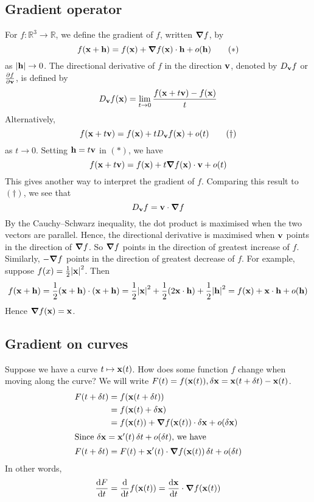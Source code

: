 \subsection{Gradient operator}
For \(f \colon \mathbb R^3 \to \mathbb R\), we define the gradient of \(f\), written \(\grad f\), by
\begin{equation}
	f(\vb x + \vb h) = f(\vb x) + \grad f(\vb x) \cdot \vb h + o(\vb h)
	\tag{\(\ast\)}
\end{equation}
as \(\abs{\vb h} \to 0\).
The directional derivative of \(f\) in the direction \(\vb v\), denoted by \(D_{\vb v} f\) or \(\frac{\partial f}{\partial \vb v}\), is defined by
\[
	D_{\vb v} f(\vb x) = \lim_{t \to 0} \frac{f(\vb x + t\vb v) - f(\vb x)}{t}
\]
Alternatively,
\begin{equation}
	f(\vb x + t\vb v) = f(\vb x) + t D_{\vb v}f(\vb x) + o(t)
	\tag{\(\dagger\)}
\end{equation}
as \(t \to 0\).
Setting \(\vb h = t\vb v\) in \((\ast)\), we have
\[
	f(\vb x + t\vb v) = f(\vb x) + t \grad f(\vb x) \cdot \vb v + o(t)
\]
This gives another way to interpret the gradient of \(f\).
Comparing this result to \((\dagger)\), we see that
\[
	D_{\vb v} f = \vb v \cdot \grad f
\]
By the Cauchy--Schwarz inequality, the dot product is maximised when the two vectors are parallel.
Hence, the directional derivative is maximised when \(\vb v\) points in the direction of \(\grad f\).
So \(\grad f\) points in the direction of greatest increase of \(f\).
Similarly, \(-\grad f\) points in the direction of greatest decrease of \(f\).
For example, suppose \(f(x) = \frac{1}{2}\abs{\vb x}^2\).
Then
\[
	f(\vb x + \vb h) = \frac{1}{2}(\vb x + \vb h)\cdot (\vb x + \vb h) = \frac{1}{2}\abs{\vb x}^2 + \frac{1}{2}(2\vb x \cdot \vb h) + \frac{1}{2}\abs{\vb h}^2 = f(\vb x) + \vb x \cdot \vb h + o(\vb h)
\]
Hence \(\grad f(\vb x) = \vb x\).

\subsection{Gradient on curves}
Suppose we have a curve \(t \mapsto \vb x(t)\).
How does some function \(f\) change when moving along the curve?
We will write \(F(t) = f(\vb x(t)), \delta \vb x = \vb x(t + \delta t) - \vb x(t)\).
\begin{align*}
	F(t + \delta t) & = f(\vb x(t + \delta t))                                               \\
	                & = f(\vb x(t) + \delta \vb x)                                           \\
	                & = f(\vb x(t)) + \grad f(\vb x(t)) \cdot \delta \vb x + o(\delta \vb x) \\
	\intertext{Since \(\delta \vb x = \vb x'(t) \,\delta t + o(\delta t)\), we have}
	F(t + \delta t) & = F(t) + \vb x'(t) \cdot \grad f(\vb x(t)) \,\delta t + o(\delta t)
\end{align*}
In other words,
\[
	\frac{\dd{F}}{\dd{t}} = \frac{\dd}{\dd{t}}f(\vb x(t)) = \frac{\dd \vb x}{\dd{t}} \cdot \grad f(\vb x(t))
\]


